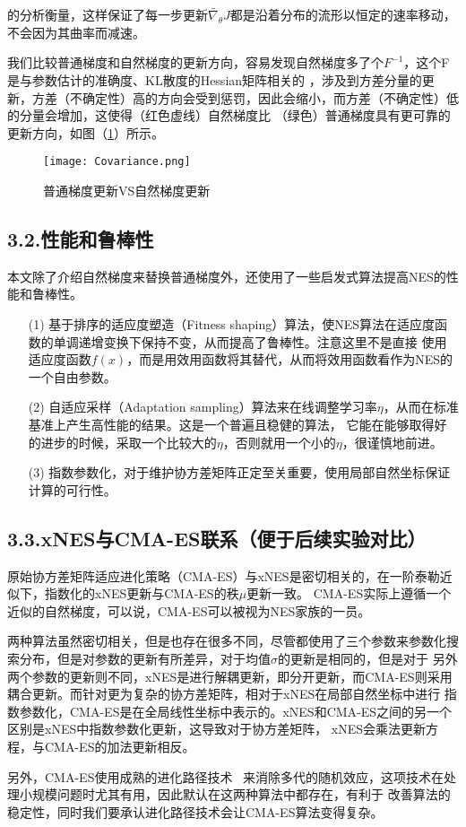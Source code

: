 \documentclass[lang=cn,11pt,cite=super]{elegantpaper}
\begin{document}
的分析衡量，这样保证了每一步更新$\tilde{\nabla _{\theta}}J$都是沿着分布的流形以恒定的速率移动，不会因为其曲率而减速。
\par
我们比较普通梯度和自然梯度的更新方向，容易发现自然梯度多了个$F^{-1}$，这个F是与参数估计的准确度、KL散度的Hessian矩阵相关的
，涉及到方差分量的更新，方差（不确定性）高的方向会受到惩罚，因此会缩小，而方差（不确定性）低的分量会增加，这使得（红色虚线）自然梯度比
（绿色）普通梯度具有更可靠的更新方向，如图（\ref{CovarianceS}）所示。
\begin{figure}[htbp]
  \centering
  \texttt{[image: Covariance.png]}
  \caption{普通梯度更新VS自然梯度更新}\label{CovarianceS}
\end{figure}
\newpage
\subsection*{\textcolor[RGB]{60,113,183}{3.2.性能和鲁棒性}}
本文除了介绍自然梯度来替换普通梯度外，还使用了一些启发式算法提高NES的性能和鲁棒性。
\begin{itemize}
  \item [(1)]基于排序的适应度塑造（Fitness shaping）算法，使NES算法在适应度函数的单调递增变换下保持不变，从而提高了鲁棒性。注意这里不是直接
  使用适应度函数$f(x)$，而是用效用函数将其替代，从而将效用函数看作为NES的一个自由参数。
  \item [(2)]自适应采样（Adaptation sampling）算法来在线调整学习率$\eta$，从而在标准基准上产生高性能的结果。这是一个普遍且稳健的算法，
  它能在能够取得好的进步的时候，采取一个比较大的$\eta$，否则就用一个小的$\eta$，很谨慎地前进。
  \item [(3)]指数参数化，对于维护协方差矩阵正定至关重要，使用局部自然坐标保证计算的可行性。
\end{itemize}
\subsection*{\textcolor[RGB]{60,113,183}{3.3.xNES与CMA-ES联系（便于后续实验对比）}}
原始协方差矩阵适应进化策略（CMA-ES）与xNES是密切相关的，在一阶泰勒近似下，指数化的xNES更新与CMA-ES的秩$\mu$更新一致。
CMA-ES实际上遵循一个近似的自然梯度，可以说，CMA-ES可以被视为NES家族的一员。
\par
两种算法虽然密切相关，但是也存在很多不同，尽管都使用了三个参数来参数化搜索分布，但是对参数的更新有所差异，对于均值$\sigma$的更新是相同的，但是对于
另外两个参数的更新则不同，xNES是进行解耦更新，即分开更新，而CMA-ES则采用耦合更新。而针对更为复杂的协方差矩阵，相对于xNES在局部自然坐标中进行
指数参数化，CMA-ES是在全局线性坐标中表示的。xNES和CMA-ES之间的另一个区别是xNES中指数参数化更新，这导致对于协方差矩阵，
xNES会乘法更新方程，与CMA-ES的加法更新相反。
\par
另外，CMA-ES使用成熟的进化路径技术~\cite{li2016does} 来消除多代的随机效应，这项技术在处理小规模问题时尤其有用，因此默认在这两种算法中都存在，有利于
改善算法的稳定性，同时我们要承认进化路径技术会让CMA-ES算法变得复杂。
\end{document}
